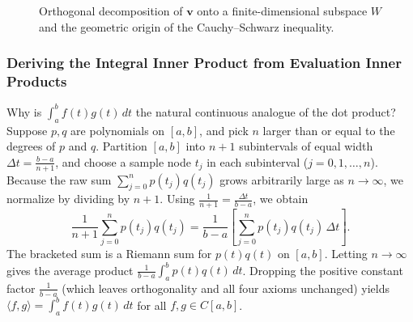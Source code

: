 \documentclass[11pt, letterpaper]{article}
\theoremstyle{definition}
\theoremstyle{remark}
\begin{document}
\begin{figure}[htbp]
\centering
{}
\caption{Orthogonal decomposition of $\mathbf{v}$ onto a finite-dimensional subspace $W$ and the geometric origin of the Cauchy--Schwarz inequality.}
\end{figure}

\subsubsection*{Deriving the Integral Inner Product from Evaluation Inner Products}
Why is $\int_a^b f(t)g(t)\,dt$ the natural continuous analogue of the dot product? Suppose $p, q$ are polynomials on $[a, b]$, and pick $n$ larger than or equal to the degrees of $p$ and $q$. Partition $[a, b]$ into $n+1$ subintervals of equal width $\Delta t = \frac{b-a}{n+1}$, and choose a sample node $t_j$ in each subinterval ($j = 0, 1, \dots, n$). Because the raw sum $\sum_{j=0}^n p(t_j)q(t_j)$ grows arbitrarily large as $n \to \infty$, we normalize by dividing by $n+1$. Using $\frac{1}{n+1} = \frac{\Delta t}{b-a}$, we obtain
\[
    \frac{1}{n+1} \sum_{j=0}^n p(t_j)q(t_j) = \frac{1}{b-a} \left[ \sum_{j=0}^n p(t_j)q(t_j)\,\Delta t \right].
\]
The bracketed sum is a Riemann sum for $p(t)q(t)$ on $[a, b]$. Letting $n \to \infty$ gives the average product $\frac{1}{b-a}\int_a^b p(t)q(t)\,dt$. Dropping the positive constant factor $\frac{1}{b-a}$ (which leaves orthogonality and all four axioms unchanged) yields $\langle f, g \rangle = \int_a^b f(t)g(t)\,dt$ for all $f, g \in C[a, b]$.
\end{document}
